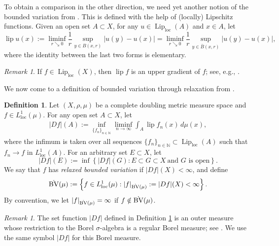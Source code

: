 \documentclass[11pt]{amsart}
\theoremstyle{definition}
\newtheorem{definition}[theorem]{Definition}
\theoremstyle{remark}
\newtheorem{remark}[theorem]{Remark}
\numberwithin{equation}{section}
\begin{document}
To obtain a comparison in the other direction, we need yet another notion of the bounded
variation
from \cite{M:03}. This is defined with the help of (locally) Lipschitz functions.
Given an open set $A\subset X$, for any $u\in\operatorname{Lip}_{\mathrm{loc}}(A)$ and $x\in
A$, let
\begin{equation}\label{eq:lipu}
  \operatorname{lip}u(x)
  :=\liminf_{r\searrow 0}\frac{1}{r}\sup_{y\in B(x,r)}|u(y)-u(x)|
  =\liminf_{r\searrow 0}\frac{1}{r}\sup_{y\in \bar B(x,r)}|u(y)-u(x)|,
\end{equation}
where the identity between the last two forms is elementary.

\begin{remark}\label{rem:lipu}
If $f\in\operatorname{Lip}_{\mathrm{loc}}(X)$,
then $\operatorname{lip} f$ is an upper gradient of $f$;
see, e.g., \cite[Lemma 6.2.6]{HKST:book}.
\end{remark}

We now come to a definition of bounded variation through relaxation from \cite{M:03}.

\begin{definition}\label{def:BV-Mir}
Let $(X,\rho,\mu)$ be a complete doubling metric measure space and $f\in
L_{\mathrm{loc}}^1(\mu)$.
For any open set $A\subset X$, let
\begin{align}\label{eq:Df(A)}
  |Df|(A):=\inf_{\{f_n\}_{n\in\mathbb N}}
  \liminf_{n\to\infty}\int_A\operatorname{lip}f_n(x)\,d\mu(x),
\end{align}
where the infimum is taken over all sequences
$\{f_n\}_{n\in\mathbb N}\subset\operatorname{Lip}_{\mathrm{loc}}(A)$ such that
$f_n\to f$ in $L_{\mathrm{loc}}^1(A)$. For an arbitrary set $E\subset X$, let
$$
|Df|(E):=\inf\left\{|Df|(G): E\subset G\subset X
\ \text{and }G\text{ is open}\right\}.
$$
We say that $f$ has {\em relaxed bounded variation} if $|Df|(X)<\infty$, and define
\begin{align}\label{BV}
\dot{\rm BV}(\mu):=\left\{f\in L_{\mathrm{loc}}^1(\mu):
|f|_{\dot{\rm BV}(\mu)}:=|Df|(X)<\infty\right\}.
\end{align}
By convention, we let $|f|_{\dot{\rm BV}(\mu)}=\infty$ if
$f\notin\dot{\rm BV}(\mu)$. \end{definition}

\begin{remark}\label{rem:BV-Mir}
The set function $|Df|$ defined in Definition \ref{def:BV-Mir} is an outer measure whose
restriction to the Borel
$\sigma$-algebra is a regular Borel measure; see \cite{M:03}. We use the same symbol $|Df|$
for this Borel measure.
\end{remark}
\end{document}
